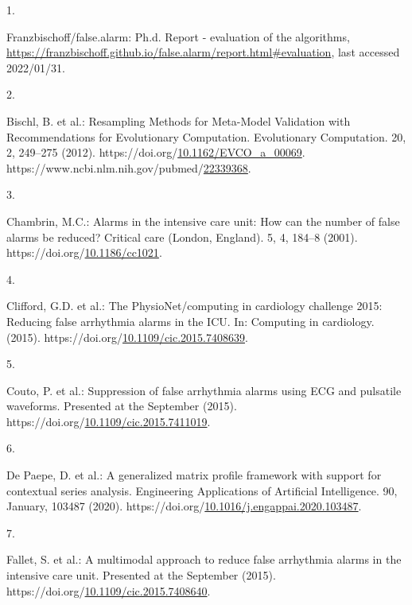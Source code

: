 \documentclass[runningheads]{llncs}
\newlength{\cslhangindent}
\newlength{\csllabelwidth}
\newenvironment{CSLReferences}[2] %
 {%
  \setlength{\parindent}{0pt}
  \ifodd #1 \everypar{\setlength{\hangindent}{\cslhangindent}}\ignorespaces\fi
  \ifnum #2 > 0
  \setlength{\parskip}{#2\baselineskip}
  \fi
 }%
 {}
\newcommand{\CSLLeftMargin}[1]{\parbox[t]{\csllabelwidth}{#1}}
\newcommand{\CSLRightInline}[1]{\parbox[t]{\linewidth - \csllabelwidth}{#1}\break}
\begin{document}
\hypertarget{refs}{}
\begin{CSLReferences}{0}{0}
\leavevmode{}%
\CSLLeftMargin{1. }
\CSLRightInline{Franzbischoff/false.alarm: Ph.d. Report - evaluation of the algorithms, \url{https://franzbischoff.github.io/false.alarm/report.html\#evaluation}, last accessed 2022/01/31.}

\leavevmode{}%
\CSLLeftMargin{2. }
\CSLRightInline{Bischl, B. et al.: {Resampling Methods for Meta-Model Validation with Recommendations for Evolutionary Computation}. Evolutionary Computation. 20, 2, 249--275 (2012). https://doi.org/\href{https://doi.org/10.1162/EVCO_a_00069}{10.1162/EVCO\_a\_00069}. https://www.ncbi.nlm.nih.gov/pubmed/\href{https://www.ncbi.nlm.nih.gov/pubmed/22339368}{22339368}.}

\leavevmode{}%
\CSLLeftMargin{3. }
\CSLRightInline{Chambrin, M.C.: Alarms in the intensive care unit: How can the number of false alarms be reduced? Critical care (London, England). 5, 4, 184--8 (2001). https://doi.org/\href{https://doi.org/10.1186/cc1021}{10.1186/cc1021}.}

\leavevmode{}%
\CSLLeftMargin{4. }
\CSLRightInline{Clifford, G.D. et al.: The PhysioNet/computing in cardiology challenge 2015: Reducing false arrhythmia alarms in the ICU. In: Computing in cardiology. (2015). https://doi.org/\href{https://doi.org/10.1109/cic.2015.7408639}{10.1109/cic.2015.7408639}.}

\leavevmode{}%
\CSLLeftMargin{5. }
\CSLRightInline{Couto, P. et al.: Suppression of false arrhythmia alarms using ECG and pulsatile waveforms. Presented at the September (2015). https://doi.org/\href{https://doi.org/10.1109/cic.2015.7411019}{10.1109/cic.2015.7411019}.}

\leavevmode{}%
\CSLLeftMargin{6. }
\CSLRightInline{De Paepe, D. et al.: {A generalized matrix profile framework with support for contextual series analysis}. Engineering Applications of Artificial Intelligence. 90, January, 103487 (2020). https://doi.org/\href{https://doi.org/10.1016/j.engappai.2020.103487}{10.1016/j.engappai.2020.103487}.}

\leavevmode{}%
\CSLLeftMargin{7. }
\CSLRightInline{Fallet, S. et al.: A multimodal approach to reduce false arrhythmia alarms in the intensive care unit. Presented at the September (2015). https://doi.org/\href{https://doi.org/10.1109/cic.2015.7408640}{10.1109/cic.2015.7408640}.}


\end{CSLReferences}
\end{document}
